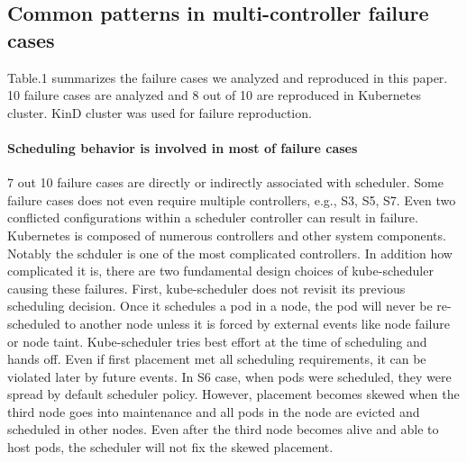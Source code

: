 \subsection*{Common patterns in multi-controller failure cases}
Table.1 summarizes the failure cases we analyzed and reproduced in this paper. 10 failure cases are analyzed and 8 out of 10 are reproduced in Kubernetes cluster. KinD cluster was used for failure reproduction.

\paragraph*{Scheduling behavior is involved in most of failure cases} 7 out 10 failure cases are directly or indirectly associated with scheduler. Some failure cases does not even require multiple controllers, e.g., S3, S5, S7. Even two conflicted configurations within a scheduler controller can result in failure. Kubernetes is composed of numerous controllers and other system components. Notably the schduler is one of the most complicated controllers. In addition how complicated it is, there are two fundamental design choices of kube-scheduler causing these failures. First, kube-scheduler does not revisit its previous scheduling decision. Once it schedules a pod in a node, the pod will never be re-scheduled to another node unless it is forced by external events like node failure or node taint. Kube-scheduler tries best effort at the time of scheduling and hands off. Even if first placement met all scheduling requirements, it can be violated later by future events. In S6 case, when pods were scheduled, they were spread by default scheduler policy. However, placement becomes skewed when the third node goes into maintenance and all pods in the node are evicted and scheduled in other nodes. Even after the third node becomes alive and able to host pods, the scheduler will not fix the skewed placement. 

